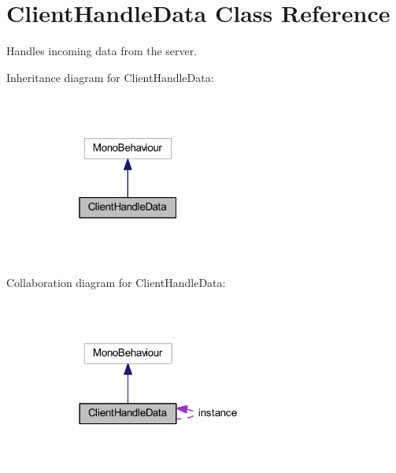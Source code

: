 \hypertarget{class_client_handle_data}{}\section{Client\+Handle\+Data Class Reference}
\label{class_client_handle_data}


Handles incoming data from the server.  




Inheritance diagram for Client\+Handle\+Data\+:\nopagebreak
\begin{figure}[H]
\begin{center}
\leavevmode
\includegraphics[width=172pt]{class_client_handle_data__inherit__graph}
\end{center}
\end{figure}


Collaboration diagram for Client\+Handle\+Data\+:\nopagebreak
\begin{figure}[H]
\begin{center}
\leavevmode
\includegraphics[width=230pt]{class_client_handle_data__coll__graph}
\end{center}
\end{figure}
